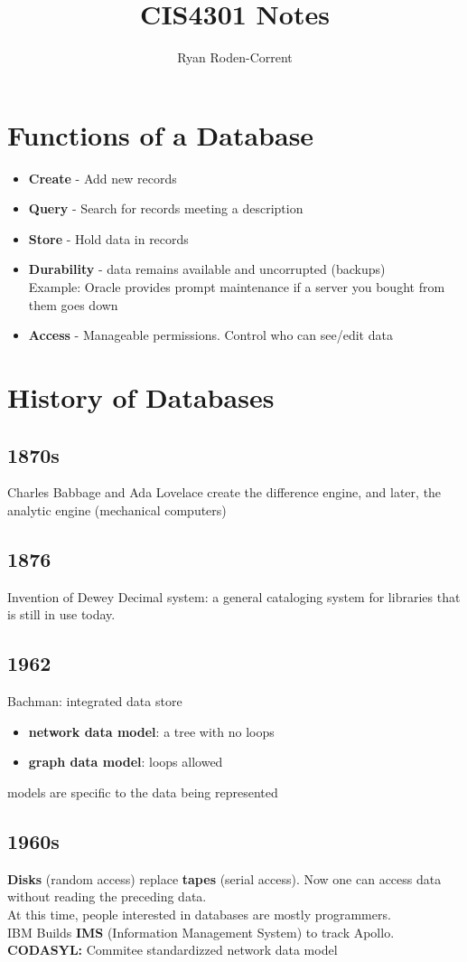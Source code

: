 \documentclass{article}
\title{CIS4301 Notes}
\author{Ryan Roden-Corrent}
\date{}
\begin{document}
\maketitle
\section{Functions of a Database}
\begin{itemize}
    \item \textbf{Create} - Add new records
    \item \textbf{Query} - Search for records meeting a description
    \item \textbf{Store} - Hold data in records
    \item \textbf{Durability} - data remains available and uncorrupted (backups)\\
        Example: Oracle provides prompt maintenance if a server you bought from
        them goes down
    \item \textbf{Access} - Manageable permissions. Control who can see/edit
        data
\end{itemize}

\section{History of Databases}
\subsection*{1870s}
Charles Babbage and Ada Lovelace create the difference engine, and later, the
analytic engine (mechanical computers)
\subsection*{1876}
Invention of Dewey Decimal system: a general cataloging system for libraries
that is still in use today.
\subsection*{1962}
Bachman: integrated data store
\begin{itemize}
    \item \textbf{network data model}: a tree with no loops
    \item \textbf{graph data model}: loops allowed
\end{itemize}
models are specific to the data being represented
\subsection*{1960s}
\textbf{Disks} (random access) replace \textbf{tapes} (serial access).
Now one can access data without reading the preceding data.\\
At this time, people interested in databases are mostly programmers.\\
IBM Builds \textbf{IMS} (Information Management System) to track Apollo.\\
\textbf{CODASYL:} Commitee standardizzed network data model
\end{document}

